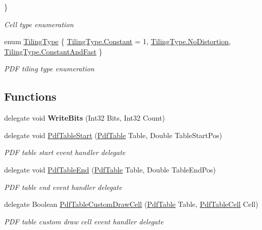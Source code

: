 \begin{DoxyCompactItemize}
 \}\begin{DoxyCompactList}\small\item\em Cell type enumeration \end{DoxyCompactList}
\item 
enum \hyperlink{namespace_pdf_file_writer_a1318e29d2b6d734592dc70a0f30004da}{Tiling\+Type} \{ \hyperlink{namespace_pdf_file_writer_a1318e29d2b6d734592dc70a0f30004daacb17869fe51048b5a5c4c6106551a255}{Tiling\+Type.\+Constant} = 1, 
\hyperlink{namespace_pdf_file_writer_a1318e29d2b6d734592dc70a0f30004daadb54e2f0bd5036e9b47250407462fa32}{Tiling\+Type.\+No\+Distortion}, 
\hyperlink{namespace_pdf_file_writer_a1318e29d2b6d734592dc70a0f30004daa9204f4e9c44b9ac37a14f8d76f3729e1}{Tiling\+Type.\+Constant\+And\+Fast}
 \}\begin{DoxyCompactList}\small\item\em P\+DF tiling type enumeration \end{DoxyCompactList}
\end{DoxyCompactItemize}
\subsection*{Functions}
\begin{DoxyCompactItemize}
\item 
delegate void {\bfseries Write\+Bits} (Int32 Bits, Int32 Count)\hypertarget{namespace_pdf_file_writer_ad8114066c2e980dc574fbbf19693255e}{}\label{namespace_pdf_file_writer_ad8114066c2e980dc574fbbf19693255e}

\item 
delegate void \hyperlink{namespace_pdf_file_writer_a043ecee26978d61494df91c2572eb1eb}{Pdf\+Table\+Start} (\hyperlink{class_pdf_file_writer_1_1_pdf_table}{Pdf\+Table} Table, Double Table\+Start\+Pos)
\begin{DoxyCompactList}\small\item\em P\+DF table start event handler delegate \end{DoxyCompactList}\item 
delegate void \hyperlink{namespace_pdf_file_writer_a17b93cf2af3fc48d06acff205f00cfac}{Pdf\+Table\+End} (\hyperlink{class_pdf_file_writer_1_1_pdf_table}{Pdf\+Table} Table, Double Table\+End\+Pos)
\begin{DoxyCompactList}\small\item\em P\+DF table end event handler delegate \end{DoxyCompactList}\item 
delegate Boolean \hyperlink{namespace_pdf_file_writer_a86406086785ea2ff62fdff82e3cd0d85}{Pdf\+Table\+Custom\+Draw\+Cell} (\hyperlink{class_pdf_file_writer_1_1_pdf_table}{Pdf\+Table} Table, \hyperlink{class_pdf_file_writer_1_1_pdf_table_cell}{Pdf\+Table\+Cell} Cell)
\begin{DoxyCompactList}\small\item\em P\+DF table custom draw cell event handler delegate \end{DoxyCompactList}\end{DoxyCompactItemize}


